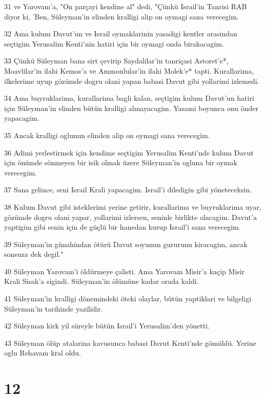 \par 31 ve Yarovam'a, "On parçayi kendine al" dedi, "Çünkü Israil'in Tanrisi RAB diyor ki, 'Ben, Süleyman'in elinden kralligi alip on oymagi sana verecegim.
\par 32 Ama kulum Davut'un ve Israil oymaklarinin yasadigi kentler arasindan seçtigim Yerusalim Kenti'nin hatiri için bir oymagi onda birakacagim.
\par 33 Çünkü Süleyman bana sirt çevirip Saydalilar'in tanriçasi Astoret'e*, Moavlilar'in ilahi Kemos'a ve Ammonlular'in ilahi Molek'e* tapti. Kurallarima, ilkelerime uyup gözümde dogru olani yapan babasi Davut gibi yollarimi izlemedi.
\par 34 Ama buyruklarima, kurallarima bagli kalan, seçtigim kulum Davut'un hatiri için Süleyman'in elinden bütün kralligi almayacagim. Yasami boyunca onu önder yapacagim.
\par 35 Ancak kralligi oglunun elinden alip on oymagi sana verecegim.
\par 36 Adimi yerlestirmek için kendime seçtigim Yerusalim Kenti'nde kulum Davut için önümde sönmeyen bir isik olmak üzere Süleyman'in ogluna bir oymak verecegim.
\par 37 Sana gelince, seni Israil Krali yapacagim. Israil'i diledigin gibi yöneteceksin.
\par 38 Kulum Davut gibi isteklerimi yerine getirir, kurallarima ve buyruklarima uyar, gözümde dogru olani yapar, yollarimi izlersen, seninle birlikte olacagim. Davut'a yaptigim gibi senin için de güçlü bir hanedan kurup Israil'i sana verecegim.
\par 39 Süleyman'in günahindan ötürü Davut soyunun gururunu kiracagim, ancak sonsuza dek degil."
\par 40 Süleyman Yarovam'i öldürmeye çalisti. Ama Yarovam Misir'a kaçip Misir Krali Sisak'a sigindi. Süleyman'in ölümüne kadar orada kaldi.
\par 41 Süleyman'in kralligi dönemindeki öteki olaylar, bütün yaptiklari ve bilgeligi Süleyman'in tarihinde yazilidir.
\par 42 Süleyman kirk yil süreyle bütün Israil'i Yerusalim'den yönetti.
\par 43 Süleyman ölüp atalarina kavusunca babasi Davut Kenti'nde gömüldü. Yerine oglu Rehavam kral oldu.

\chapter{12}

